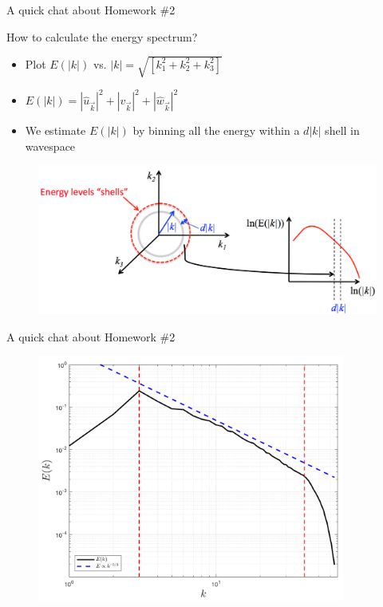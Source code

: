 \begin{frame}{A quick chat about Homework \#2}

How to calculate the energy spectrum?
\begin{itemize}
	\item Plot $E(|k|)$ vs. $|k|=\sqrt{[k_1^2 + k_2^2 + k_3^2]}$
	\item $E(|k|) = |\hat u_{\vec{k}}|^2 + |\hat v_{\vec{k}}|^2 + |\hat w_{\vec{k}}|^2$
	\item We estimate $E(|k|)$ by binning all the energy within a $d|k|$ shell in wavespace 
\end{itemize}

\begin{figure}
	\includegraphics[width=\textwidth]{3dspectra1}
\end{figure}

\end{frame}


\begin{frame}{A quick chat about Homework \#2}

\begin{figure}
	\includegraphics[width=0.9\textwidth]{3dspectra2}
\end{figure}

\end{frame}

